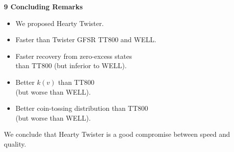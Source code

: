 \documentclass[a4j,12pt,landscape]{jarticle}
\begin{document}
\newpage
\noindent
{\bf 9 Concluding Remarks}
\begin{itemize}
\item We proposed Hearty Twister. 
\item Faster than Twister GFSR TT800 and WELL.
\item Faster recovery from zero-excess states \\
than TT800 (but inferior to WELL). 
\item Better $k(v)$ than TT800 \\
(but worse than WELL).
\item Better coin-tossing distribution than TT800 \\
(but worse than WELL).
\end{itemize}
We conclude that Hearty Twister is a good compromise
between speed and quality. 

%
%
%
\end{document}
